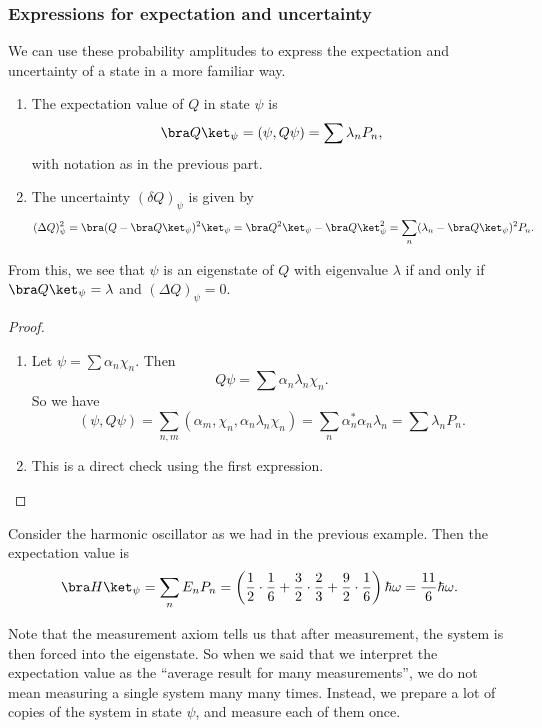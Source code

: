 \documentclass[a4paper]{article}
\begin{document}
\subsubsection*{Expressions for expectation and uncertainty}
We can use these probability amplitudes to express the expectation and uncertainty of a state in a more familiar way.
\begin{prop}\leavevmode
  \begin{enumerate}
    \item The expectation value of $Q$ in state $\psi$ is
      \[
        \bra Q\ket_\psi = (\psi, Q\psi) = \sum \lambda_n P_n,
      \]
      with notation as in the previous part.
    \item The uncertainty $(\delta Q)_\psi$ is given by
      \[
        (\Delta Q)^2_\psi = \bra (Q - \bra Q\ket_\psi)^2\ket_\psi = \bra Q^2\ket_\psi - \bra Q\ket_\psi^2 = \sum_n (\lambda_n - \bra Q\ket_\psi)^2 P_n.
      \]
  \end{enumerate}
\end{prop}
From this, we see that $\psi$ is an eigenstate of $Q$ with eigenvalue $\lambda$ if and only if $\bra Q\ket_\psi = \lambda$ and $(\Delta Q)_\psi = 0$.

\begin{proof}\leavevmode
  \begin{enumerate}
    \item Let $\psi = \sum \alpha_n \chi_n$. Then
      \[
        Q \psi = \sum \alpha_n \lambda_n \chi_n.
      \]
      So we have
      \[
        (\psi, Q\psi) = \sum_{n, m}(\alpha_m, \chi_n, \alpha_n \lambda_n \chi_n) = \sum_n \alpha_n^* \alpha_n \lambda_n = \sum \lambda_n P_n.
      \]
    \item This is a direct check using the first expression.
  \end{enumerate}
\end{proof}

\begin{eg}
  Consider the harmonic oscillator as we had in the previous example. Then the expectation value is
  \[
    \bra H\ket_\psi = \sum_n E_n P_n = \left(\frac{1}{2} \cdot \frac{1}{6} + \frac{3}{2} \cdot \frac{2}{3} + \frac{9}{2}\cdot \frac{1}{6}\right)\hbar \omega = \frac{11}{6}\hbar \omega.
  \]
\end{eg}
Note that the measurement axiom tells us that after measurement, the system is then forced into the eigenstate. So when we said that we interpret the expectation value as the ``average result for many measurements'', we do not mean measuring a single system many many times. Instead, we prepare a lot of copies of the system in state $\psi$, and measure each of them once.
\end{document}
